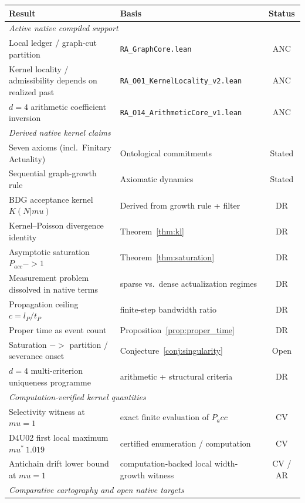\documentclass[11pt]{article}
\def\ell{l}%
\def\mu{mu}%
\def\mathrm#1{#1}%
\def\mathbf#1{#1}%
\def\approx{~}%
\def\to{->}%
\def\Pacc{P_acc}%
\newcommand{\Pacc}{\ensuremath{P_{\mathrm{acc}}}}
\begin{document}
\begin{center}
\begin{tabular}{llc}
\toprule
Result & Basis & Status \\
\midrule
\multicolumn{3}{l}{\textit{Active native compiled support}} \\
Local ledger / graph-cut partition & \texttt{RA\_GraphCore.lean} & ANC \\
Kernel locality / admissibility depends on realized past & \texttt{RA\_O01\_KernelLocality\_v2.lean} & ANC \\
$d=4$ arithmetic coefficient inversion & \texttt{RA\_O14\_ArithmeticCore\_v1.lean} & ANC \\
\midrule
\multicolumn{3}{l}{\textit{Derived native kernel claims}} \\
Seven axioms (incl.\ Finitary Actuality) & Ontological commitments & Stated \\
Sequential graph-growth rule & Axiomatic dynamics & Stated \\
BDG acceptance kernel $K(\mathbf{N}|\mu)$ & Derived from growth rule + filter & DR \\
Kernel--Poisson divergence identity & Theorem~\ref{thm:kl} & DR \\
Asymptotic saturation $P_{\mathrm{acc}}\to 1$ & Theorem~\ref{thm:saturation} & DR \\
Measurement problem dissolved in native terms & sparse vs.\ dense actualization regimes & DR \\
Propagation ceiling $c=\ell_P/t_P$ & finite-step bandwidth ratio & DR \\
Proper time as event count & Proposition~\ref{prop:proper_time} & DR \\
Saturation $\to$ partition / severance onset & Conjecture~\ref{conj:singularity} & Open \\
$d=4$ multi-criterion uniqueness programme & arithmetic + structural criteria & DR \\
\midrule
\multicolumn{3}{l}{\textit{Computation-verified kernel quantities}} \\
Selectivity witness at $\mu=1$ & exact finite evaluation of $\Pacc$ & CV \\
D4U02 first local maximum $\mu^*\approx 1.019$ & certified enumeration / computation & CV \\
Antichain drift lower bound at $\mu=1$ & computation-backed local width-growth witness & CV / AR \\
\midrule
\multicolumn{3}{l}{\textit{Comparative cartography and open native targets}} \\

\end{tabular}
\end{center}
\end{document}
